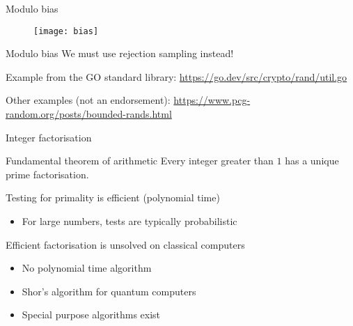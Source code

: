 \begin{frame}{Modulo bias}
  \begin{figure}
    \texttt{[image: bias]}
  \end{figure}
\end{frame}

\begin{frame}{Modulo bias}
  \pause
  We must use \alert{rejection sampling} instead!

  \vspace*{1em}

  \pause
  Example from the GO standard library:
  \url{https://go.dev/src/crypto/rand/util.go}

  \vspace*{1em}

  \pause
  Other examples (not an endorsement):
  \url{https://www.pcg-random.org/posts/bounded-rands.html}
\end{frame}

\begin{frame}{Integer factorisation}
  \pause
  \begin{block}{Fundamental theorem of arithmetic}
    Every integer greater than $1$ has a unique prime factorisation.
  \end{block}

  \pause
  Testing for primality is efficient (polynomial time)
  \pause
  \begin{itemize}
    \item For large numbers, tests are typically probabilistic
  \end{itemize}
  
  \pause
  Efficient factorisation is unsolved on classical computers
  \begin{itemize}[<+(1)->]
    \item No polynomial time algorithm
    \item Shor's algorithm for quantum computers
    \item Special purpose algorithms exist
  \end{itemize}
\end{frame}

